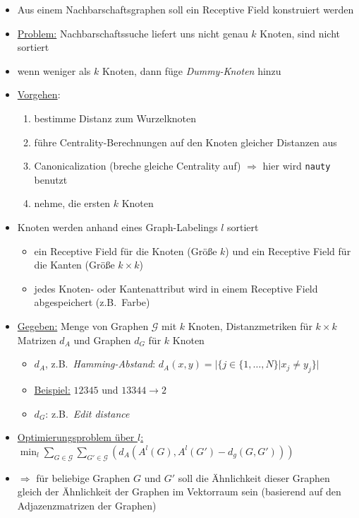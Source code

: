 \begin{itemize}
  \item Aus einem Nachbarschaftsgraphen soll ein Receptive Field konstruiert werden
  \item \underline{Problem:} Nachbarschaftssuche liefert uns nicht genau $k$ Knoten, sind nicht sortiert
  \item wenn weniger als $k$ Knoten, dann füge \emph{Dummy-Knoten} hinzu
  \item \underline{Vorgehen}:
  \begin{enumerate}
    \item bestimme Distanz zum Wurzelknoten
    \item führe Centrality-Berechnungen auf den Knoten gleicher Distanzen aus
    \item Canonicalization (breche gleiche Centrality auf) $\Rightarrow$ hier wird \texttt{nauty} benutzt
    \item nehme, die ersten $k$ Knoten
  \end{enumerate}
  \item Knoten werden anhand eines Graph-Labelings $l$ sortiert
  \begin{itemize}
    \item ein Receptive Field für die Knoten (Größe $k$) und ein Receptive Field für die Kanten (Größe $k \times k$)
    \item jedes Knoten- oder Kantenattribut wird in einem Receptive Field abgespeichert (z.B.\ Farbe)
  \end{itemize}
  \item \underline{Gegeben:} Menge von Graphen $\mathcal{G}$ mit $k$ Knoten, Distanzmetriken für $k \times k$ Matrizen $d_A$ und Graphen $d_G$ für $k$ Knoten
  \begin{itemize}
    \item $d_A$, z.B.\ \emph{Hamming-Abstand}: $d_A(x, y) = | \lbrace j \in \lbrace 1, \ldots, N \rbrace | x_j \neq y_j \rbrace |$
    \item \underline{Beispiel:} $12345$ und $13344 \rightarrow 2$
    \item $d_G$: z.B.\ \emph{Edit distance}
  \end{itemize}
  \item \underline{Optimierungsproblem über $l$:} $\min_l \sum_{G \in \mathcal{G}} \sum_{G' \in \mathcal{G}} {( d_A(A^l(G), A^l(G') - d_g(G, G')) )}$
  \item $\Rightarrow$ für beliebige Graphen $G$ und $G'$ soll die Ähnlichkeit dieser Graphen gleich der Ähnlichkeit der Graphen im Vektorraum sein (basierend auf den Adjazenzmatrizen der Graphen)

\end{itemize}
